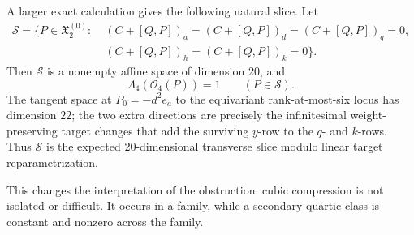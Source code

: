 A larger exact calculation gives the following natural slice.  Let
\[
\begin{aligned}
\mathscr S=\{P\in\mathfrak X_2^{(0)}:\;&
(C+[Q,P])_a=(C+[Q,P])_d=(C+[Q,P])_q=0,\\
&
(C+[Q,P])_h=(C+[Q,P])_k=0\}.
\end{aligned}
\]
Then $\mathscr S$ is a nonempty affine space of dimension $20$, and
\[
\Lambda_4(\mathcal O_4(P))=1\qquad(P\in\mathscr S).
\]
The tangent space at $P_0=-d^2e_a$ to the equivariant rank-at-most-six locus has
dimension $22$; the two extra directions are precisely the infinitesimal
weight-preserving target changes that add the surviving $y$-row to the $q$-
and $k$-rows.  Thus $\mathscr S$ is the expected $20$-dimensional transverse
slice modulo linear target reparametrization.

This changes the interpretation of the obstruction: cubic compression is not
isolated or difficult.  It occurs in a family, while a secondary quartic class
is constant and nonzero across the family.
